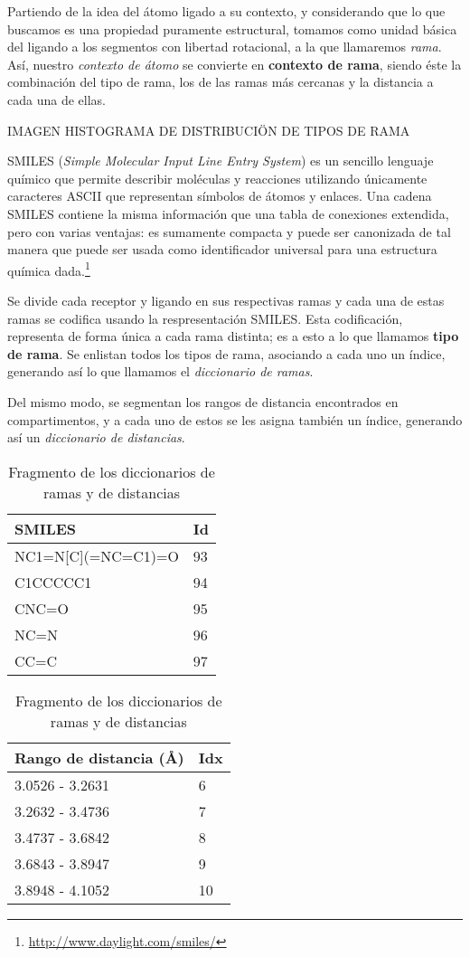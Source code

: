 Partiendo de la idea del átomo ligado a su contexto, y considerando
que lo que buscamos es una propiedad puramente estructural, tomamos
como unidad básica del ligando a los segmentos con libertad
rotacional, a la que llamaremos \textit{rama}. Así, nuestro
\textit{contexto de átomo} se convierte en \textbf{contexto de rama},
siendo éste la combinación del tipo de rama, los de las ramas más
cercanas y la distancia a cada una de ellas.

IMAGEN HISTOGRAMA DE DISTRIBUCIÖN DE TIPOS DE RAMA

SMILES (\textit{Simple Molecular Input Line Entry System}) es un
sencillo lenguaje químico que permite describir moléculas y reacciones
utilizando únicamente caracteres ASCII que representan símbolos de
átomos y enlaces. Una cadena SMILES contiene la misma información que
una tabla de conexiones extendida, pero con varias ventajas: es
sumamente compacta y puede ser canonizada de tal manera que puede ser
usada como identificador universal para una estructura química
dada.\footnote{\url{http://www.daylight.com/smiles/}}

Se divide cada receptor y ligando en sus respectivas ramas y cada una
de estas ramas se codifica usando la respresentación SMILES. Esta
codificación, representa de forma única a cada rama distinta; es a
esto a lo que llamamos \textbf{tipo de rama}. Se enlistan todos los
tipos de rama, asociando a cada uno un índice, generando así lo que
llamamos el \textit{diccionario de ramas}.

Del mismo modo, se segmentan los rangos de distancia encontrados en
compartimentos, y a cada uno de estos se les asigna también un índice,
generando así un \textit{diccionario de distancias}.

\begin{table}[H]
  \begin{center}
    \begin{tabular}{l|l}
      SMILES                 & Id \\ \hline
      NC1=N{[}C{]}(=NC=C1)=O & 93 \\
      C1CCCCC1               & 94 \\
      CNC=O                  & 95 \\
      NC=N                   & 96 \\
      CC=C                   & 97
    \end{tabular}
    \begin{tabular}{l|l}
      Rango de distancia (\AA) & Idx \\ \hline
      3.0526 - 3.2631        & 6   \\
      3.2632 - 3.4736        & 7   \\
      3.4737 - 3.6842        & 8   \\
      3.6843 - 3.8947        & 9   \\
      3.8948 - 4.1052        & 10
    \end{tabular}
  \end{center}
  \caption{Fragmento de los diccionarios de ramas y de distancias}
  \label{fig:dictionary}
\end{table}

